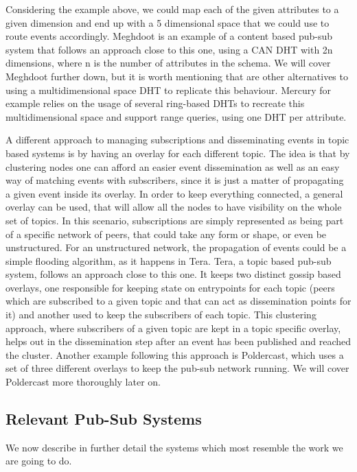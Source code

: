 Considering the example above, we could map each of the given attributes
to a given dimension and end up with a 5 dimensional space that we could
use to route events accordingly. Meghdoot is an example of a content based
pub-sub system that follows an approach close to this one,
using a CAN DHT with 2n dimensions, where n is the
number of attributes in the schema. We will cover Meghdoot further down,
but it is worth mentioning that are other alternatives to using a
multidimensional space DHT to replicate this behaviour. Mercury
for example relies on the usage of several ring-based
DHTs to recreate this multidimensional space and support range queries,
using one DHT per attribute.

A different approach to managing subscriptions and disseminating events
in topic based systems is by having an overlay for each different topic.
The idea is that by clustering nodes one can afford an easier event
dissemination as well as an easy way of matching events with
subscribers, since it is just a matter of propagating a given event
inside its overlay. In order to keep everything connected, a general
overlay can be used, that will allow all the nodes to have visibility on
the whole set of topics. In this scenario, subscriptions are simply
represented as being part of a specific network of peers, that could
take any form or shape, or even be unstructured. For an unstructured
network, the propagation of events could be a simple flooding algorithm,
as it happens in Tera. Tera, a topic based
pub-sub system, follows an approach close to this one. It keeps two
distinct gossip based overlays, one responsible for keeping state on
entrypoints for each topic (peers which are subscribed to a given topic
and that can act as dissemination points for it) and another used to
keep the subscribers of each topic. This clustering approach, where
subscribers of a given topic are kept in a topic specific overlay, helps
out in the dissemination step after an event has been published and
reached the cluster. Another example following this approach is
Poldercast, which uses a set of three
different overlays to keep the pub-sub network running. We will cover
Poldercast more thoroughly later on.

\subsection{Relevant Pub-Sub
Systems}\label{relevant-pub-sub-systems}

We now describe in further detail the systems which most resemble the
work we are going to do.


